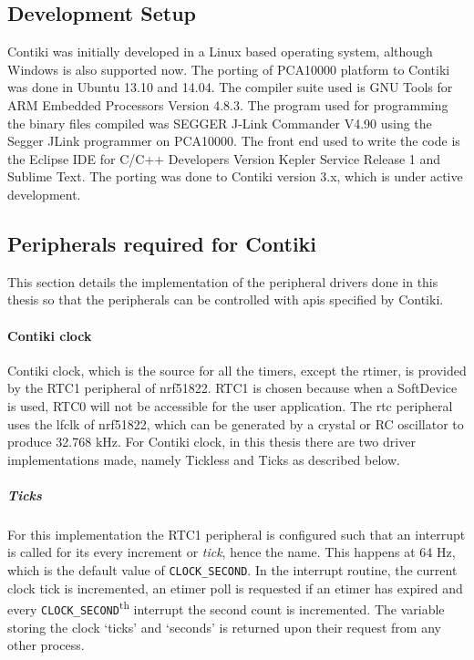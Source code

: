 \subsection{Development Setup}
Contiki was initially developed in a Linux based operating system, although Windows is also supported now. The porting of PCA10000 platform to Contiki was done in Ubuntu 13.10 and 14.04. The compiler suite used is GNU Tools for ARM Embedded Processors Version 4.8.3. The program used for programming the binary files compiled was SEGGER J-Link Commander V4.90 using the Segger JLink programmer on PCA10000. The front end used to write the code is the Eclipse IDE for C/C++ Developers Version Kepler Service Release 1 and Sublime Text. The porting was done to Contiki version 3.x, which is under active development.

\subsection{Peripherals required for Contiki}\label{peripheralsContiki}
This section details the implementation of the peripheral drivers done in this thesis so that the peripherals can be controlled with \glspl{api} specified by Contiki.
\paragraph{Contiki clock}
Contiki clock, which is the source for all the timers, except the rtimer, is provided by the RTC1 peripheral of nrf51822. RTC1 is chosen because when a SoftDevice is used, RTC0 will not be accessible for the user application. The \gls{rtc} peripheral uses the \gls{lfclk} of nrf51822, which can be generated by a crystal or RC oscillator to produce 32.768 kHz. For Contiki clock, in this thesis there are two driver implementations made, namely Tickless and Ticks as described below.

\subparagraph{Ticks}
For this implementation the RTC1 peripheral is configured such that an interrupt is called for its every increment or \emph{tick}, hence the name. This happens at 64 Hz, which is the default value of \texttt{CLOCK\_SECOND}. In the interrupt routine, the current clock tick is incremented, an etimer poll is requested if an etimer has expired and every \texttt{CLOCK\_SECOND}\textsuperscript{th} interrupt the second count is incremented. The variable storing the clock `ticks' and `seconds' is returned upon their request from any other process.


